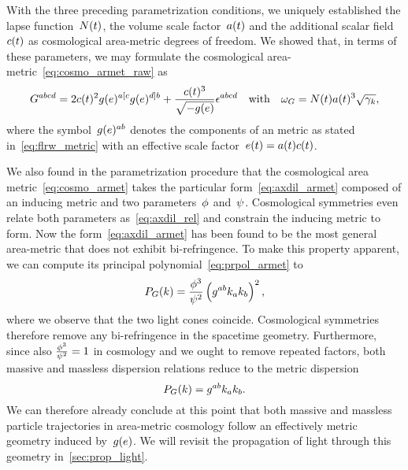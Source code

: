 With the three preceding parametrization conditions, we uniquely established the lapse function~$N(t)$, the volume scale factor~$a(t)$ and the additional scalar field~$c(t)$ as cosmological area-metric degrees of freedom. We showed that, in terms of these parameters, we may formulate the cosmological area-metric~\eqref{eq:cosmo_armet_raw} as
\begin{align}\label{eq:cosmo_armet}
	G^{abcd}=2c(t)^2g(e)^{a[ c}g(e)^{d] b}+\frac{c(t)^3}{\sqrt{-g(e)}}\epsilon^{abcd} \quad \text{with} \quad \omega_G=N(t)a(t)^3\sqrt{{\gamma_{k}}}
	\mathpunct{,}
\end{align}
where the symbol~$g(e)^{ab}$ denotes the components of an \FLRW{} metric as stated in~\eqref{eq:flrw_metric} with an effective scale factor~$e(t)=a(t)c(t)$.


We also found in the parametrization procedure that the cosmological area metric~\eqref{eq:cosmo_armet} takes the particular form~\eqref{eq:axdil_armet} composed of an inducing metric and two parameters~$\phi$ and~$\psi$. Cosmological symmetries even relate both parameters as~\eqref{eq:axdil_rel} and constrain the inducing metric to \FLRW{} form. Now the form~\eqref{eq:axdil_armet} has been found to be the most general area-metric that does not exhibit bi-refringence. To make this property apparent, we can compute its principal polynomial~\eqref{eq:prpol_armet} to
\begin{equation}\label{eq:axdil_prpol}
	P_G(k)=\frac{\phi^3}{\psi^2}\left(g^{ab}k_ak_b\right)^2
	\mathpunct{,}
\end{equation}
where we observe that the two light cones coincide. Cosmological symmetries therefore remove any bi-refringence in the spacetime geometry. Furthermore, since also ${\frac{\phi^3}{\psi^2}=1}$ in cosmology and we ought to remove repeated factors, both massive and massless dispersion relations reduce to the metric dispersion
\begin{equation}\label{eq:cosmo_armet_prpol}
	P_G(k)=g^{ab}k_ak_b
	\mathpunct{.}
\end{equation}
We can therefore already conclude at this point that both massive and massless particle trajectories in area-metric cosmology follow an effectively metric geometry induced by~$g(e)$. We will revisit the propagation of light through this geometry in~\autoref{sec:prop_light}.

